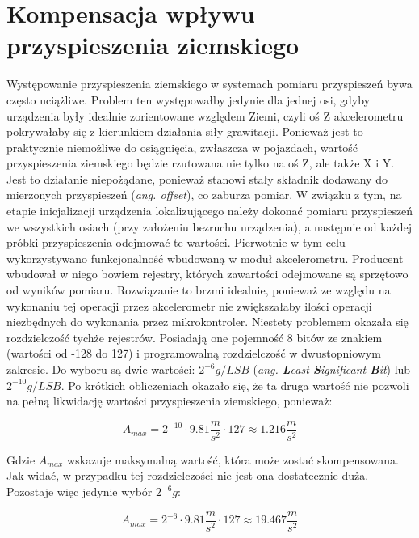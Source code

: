 \section{Kompensacja wpływu przyspieszenia ziemskiego}

Występowanie przyspieszenia ziemskiego w systemach pomiaru przyspieszeń bywa często uciążliwe. Problem ten występowałby jedynie dla jednej osi, gdyby urządzenia były idealnie zorientowane względem Ziemi, czyli oś Z akcelerometru pokrywałaby się z kierunkiem działania siły grawitacji. Ponieważ jest to praktycznie niemożliwe do osiągnięcia, zwłaszcza w pojazdach, wartość przyspieszenia ziemskiego będzie rzutowana nie tylko na oś Z, ale także X i Y. Jest to działanie niepożądane, ponieważ stanowi stały składnik dodawany do mierzonych przyspieszeń (\textit{ang. offset}), co zaburza pomiar. W związku z tym, na etapie inicjalizacji urządzenia lokalizującego należy dokonać pomiaru przyspieszeń we wszystkich osiach (przy założeniu bezruchu urządzenia), a następnie od każdej próbki przyspieszenia odejmować te wartości.
Pierwotnie w tym celu wykorzystywano funkcjonalność wbudowaną w moduł akcelerometru. Producent wbudował w niego bowiem rejestry, których zawartości odejmowane są sprzętowo od wyników pomiaru. Rozwiązanie to brzmi idealnie, ponieważ ze względu na wykonaniu tej operacji przez akcelerometr nie zwiększałaby ilości operacji niezbędnych do wykonania przez mikrokontroler. Niestety problemem okazała się rozdzielczość tychże rejestrów. Posiadają one pojemność 8 bitów ze znakiem (wartości od -128 do 127) i programowalną rozdzielczość w dwustopniowym zakresie. Do wyboru są dwie wartości: $2^{-6}g/LSB$ (\textit{ang. \textbf{L}east \textbf{S}ignificant \textbf{B}it}) lub $2^{-10}g/LSB$. 
Po krótkich obliczeniach okazało się, że ta druga wartość nie pozwoli na pełną likwidację wartości przyspieszenia ziemskiego, ponieważ:

\begin{equation}
A_{max} = 2^{-10} \cdot 9.81\frac{m}{s^2} \cdot 127 \approx 1.216 \frac{m}{s^2}
\end{equation}

Gdzie $A_{max}$ wskazuje maksymalną wartość, która może zostać skompensowana. Jak widać, w przypadku tej rozdzielczości nie jest ona dostatecznie duża. Pozostaje więc jedynie wybór $2^{-6} g$:

\begin{equation}
A_{max} = 2^{-6} \cdot 9.81\frac{m}{s^2} \cdot 127 \approx 19.467 \frac{m}{s^2}
\end{equation}

